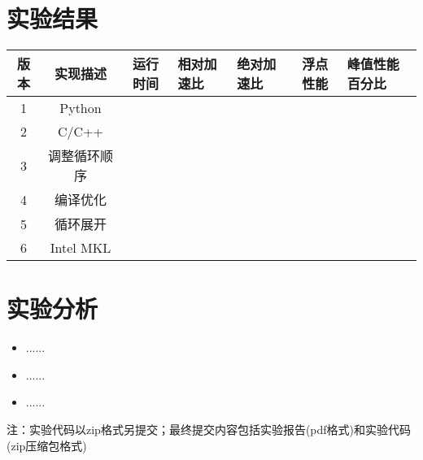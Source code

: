 \documentclass{SYSUReport}
\begin{document}
\section{实验结果}
\begin{table}[h]
    \centering
    \begin{tabular}{|c|c|c|p{1.5cm}|p{1.5cm}|c|p{2cm}|}
        \hline
        版本 & 实现描述 & 运行时间& 相对加速比 & 绝对加速比 & 浮点性能 & 峰值性能百分比 \\
        \hline
        1 & Python &  &  &  &  &\\ 
        \hline
        2 & C/C++ &  &  &  & & \\ 
        \hline
        3 & 调整循环顺序 &  &  &  & & \\ 
        \hline
        4 & 编译优化 &  &  &  & & \\ 
        \hline
        5 & 循环展开 &  &  &  &  &\\ 
        \hline
        6 & Intel MKL &  &  &  & & \\ 
        \hline
    \end{tabular}
\end{table}
\section{实验分析}
\begin{itemize}
    \item ......
    \item ......
    \item ......
\end{itemize}
注：实验代码以zip格式另提交；最终提交内容包括实验报告(pdf格式)和实验代码(zip压缩包格式)
\end{document}
